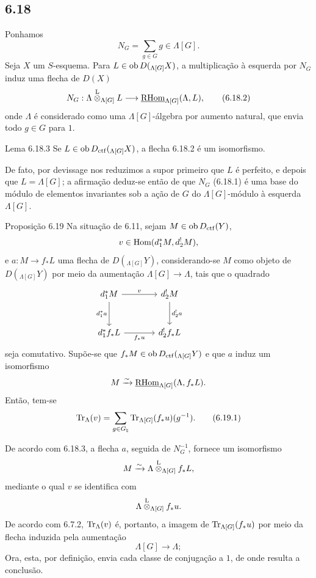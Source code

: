 \subsection*{6.18}
Ponhamos
\begin{equation}
N_G=\sum_{g\in G} g\in\Lambda[G].
\tag{6.18.1}
\end{equation}
Seja $X$ um $S$-esquema. Para $L\in\operatorname{ob} D({}_{\Lambda[G]}X)$, a multiplicação à esquerda por $N_G$ induz uma flecha de $D(X)$
\begin{equation}
N_G:\Lambda\overset{\mathrm L}{\otimes}_{\Lambda[G]}L
\longrightarrow
\underline{\mathrm{RHom}}_{\Lambda[G]}(\Lambda,L),
\tag{6.18.2}
\end{equation}
onde $\Lambda$ é considerado como uma $\Lambda[G]$-álgebra por aumento natural, que envia todo $g\in G$ para $1$.

\begin{statement}{Lema 6.18.3}
Se $L\in\operatorname{ob} D_{\mathrm{ctf}}({}_{\Lambda[G]}X)$, a flecha 6.18.2 é um isomorfismo.
\end{statement}

De fato, por devissage nos reduzimos a supor primeiro que $L$ é perfeito, e depois que $L=\Lambda[G]$; a afirmação deduz-se então de que $N_G$ (6.18.1) é uma base do módulo de elementos invariantes sob a ação de $G$ do $\Lambda[G]$-módulo à esquerda $\Lambda[G]$.

\begin{statement}{Proposição 6.19}
Na situação de 6.11, sejam $M\in\operatorname{ob} D_{\mathrm{ctf}}(Y)$,
\[
v\in\operatorname{Hom}(d_1^*M,d_2^!M),
\]
e $a:M\to f_*L$ uma flecha de $D({}_{\Lambda[G]}Y)$, considerando-se $M$ como objeto de $D({}_{\Lambda[G]}Y)$ por meio da aumentação $\Lambda[G]\to\Lambda$, tais que o quadrado
\[
\begin{tikzcd}[column sep=large,row sep=large]
d_1^*M \arrow[r,"v"] \arrow[d,"d_1^*a"'] & d_2^!M \arrow[d,"d_2^!a"] & {}\\
d_1^*f_*L \arrow[r,"f_*u"'] & d_2^!f_*L
\end{tikzcd}
\]
seja comutativo. Supõe-se que $f_*M\in\operatorname{ob} D_{\mathrm{ctf}}({}_{\Lambda[G]}Y)$ e que $a$ induz um isomorfismo
\[
M\xrightarrow{\sim}\underline{\mathrm{RHom}}_{\Lambda[G]}(\Lambda,f_*L).
\]
Então, tem-se
\begin{equation}
\operatorname{Tr}_{\Lambda}(v)=
\sum_{g\in G_{\natural}}\operatorname{Tr}_{\Lambda[G]}(f_*u)(g^{-1}).
\tag{6.19.1}
\end{equation}
\end{statement}

De acordo com 6.18.3, a flecha $a$, seguida de $N_G^{-1}$, fornece um isomorfismo
\[
M\xrightarrow{\sim}\Lambda\overset{\mathrm L}{\otimes}_{\Lambda[G]}f_*L,
\]
mediante o qual $v$ se identifica com
\[
\Lambda\overset{\mathrm L}{\otimes}_{\Lambda[G]}f_*u.
\]
De acordo com 6.7.2, $\operatorname{Tr}_{\Lambda}(v)$ é, portanto, a imagem de $\operatorname{Tr}_{\Lambda[G]}(f_*u)$ por meio da flecha induzida pela aumentação
\[
\Lambda[G]\longrightarrow \Lambda;
\]
Ora, esta, por definição, envia cada classe de conjugação a $1$, de onde resulta a conclusão.
